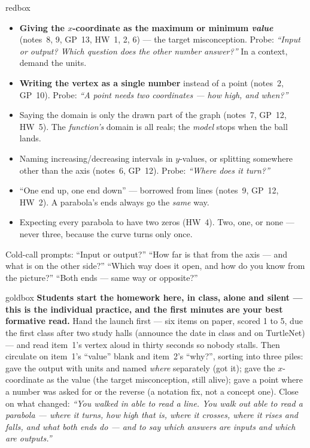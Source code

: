\documentclass[10pt]{article}
\begin{document}
\boxguard
\begin{skillbox}{redbox}
\begin{itemize}[leftmargin=1.2em, nosep]
  \item \textbf{Giving the $x$-coordinate as the maximum or minimum \emph{value}} (notes~8, 9,
        GP~13, HW~1, 2, 6) --- the target misconception. Probe: \emph{``Input or output? Which
        question does the other number answer?''} In a context, demand the units.
  \item \textbf{Writing the vertex as a single number} instead of a point (notes~2, GP~10).
        Probe: \emph{``A point needs two coordinates --- how high, and when?''}
  \item Saying the domain is only the drawn part of the graph (notes~7, GP~12, HW~5). The
        \emph{function's} domain is all reals; the \emph{model} stops when the ball lands.
  \item Naming increasing/decreasing intervals in $y$-values, or splitting somewhere other than
        the axis (notes~6, GP~12). Probe: \emph{``Where does it turn?''}
  \item ``One end up, one end down'' --- borrowed from lines (notes~9, GP~12, HW~2). A parabola's
        ends always go the \emph{same} way.
  \item Expecting every parabola to have two zeros (HW~4). Two, one, or none --- never three,
        because the curve turns only once.
\end{itemize}
Cold-call prompts: ``Input or output?'' ``How far is that from the axis --- and what is on the
other side?'' ``Which way does it open, and how do you know from the picture?'' ``Both ends ---
same way or opposite?''
\end{skillbox}

\boxguard
\begin{skillbox}{goldbox}
\textbf{Students start the homework here, in class, alone and silent --- this is the individual
practice, and the first minutes are your best formative read.} Hand the launch first --- six items
on paper, scored 1 to 5, due the first class after two study halls (announce the date in class and on
TurtleNet) --- and read item~1's vertex aloud in thirty seconds so nobody stalls. Then circulate on
item~1's ``value'' blank and item~2's ``why?'', sorting into three piles: gave the output with
units and named \emph{where} separately (got it); gave the $x$-coordinate as the value (the target
misconception, still alive); gave a point where a number was asked for or the reverse (a notation
fix, not a concept one). Close on what changed: \emph{``You walked in able to read a line. You walk
out able to read a parabola --- where it turns, how high that is, where it crosses, where it rises
and falls, and what both ends do --- and to say which answers are inputs and which are outputs.''}
\end{skillbox}
\end{document}
